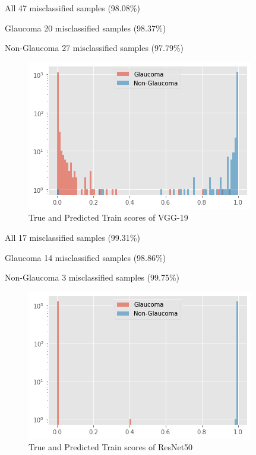 \newpage
\begin{center}
All   47 misclassified samples (98.08\%)

Glaucoma  20 misclassified samples (98.37\%)

Non-Glaucoma  27 misclassified samples (97.79\%)
\end{center}
\vspace{5mm}
\begin{figure}[hbt!]
\centering
\includegraphics[scale=0.75]{images/fig-39.png}
\caption{True and Predicted Train scores of VGG-19}
\label{fig:x True and Predicted Train scores of VGG-19}
\end{figure}
\begin{center}
All   17 misclassified samples (99.31\%)

Glaucoma  14 misclassified samples (98.86\%)

Non-Glaucoma   3 misclassified samples (99.75\%)
\end{center}
\vspace{5mm}
\begin{figure}[hbt!]
\centering
\includegraphics[scale=0.75]{images/fig-40.png}
\caption{True and Predicted Train scores of ResNet50}
\label{fig:x True and Predicted Train scores of ResNet50}
\end{figure}

